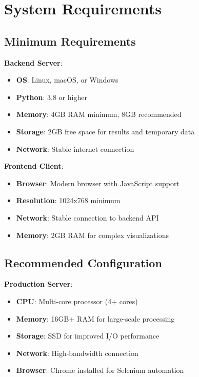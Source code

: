\section{System Requirements}
\label{sec:system-requirements}

\subsection{Minimum Requirements}
\label{subsec:minimum-requirements}

\textbf{Backend Server}:
\begin{itemize}
    \item \textbf{OS}: Linux, macOS, or Windows
    \item \textbf{Python}: 3.8 or higher
    \item \textbf{Memory}: 4GB RAM minimum, 8GB recommended
    \item \textbf{Storage}: 2GB free space for results and temporary data
    \item \textbf{Network}: Stable internet connection
\end{itemize}

\textbf{Frontend Client}:
\begin{itemize}
    \item \textbf{Browser}: Modern browser with JavaScript support
    \item \textbf{Resolution}: 1024x768 minimum
    \item \textbf{Network}: Stable connection to backend API
    \item \textbf{Memory}: 2GB RAM for complex visualizations
\end{itemize}

\subsection{Recommended Configuration}
\label{subsec:recommended-configuration}

\textbf{Production Server}:
\begin{itemize}
    \item \textbf{CPU}: Multi-core processor (4+ cores)
    \item \textbf{Memory}: 16GB+ RAM for large-scale processing
    \item \textbf{Storage}: SSD for improved I/O performance
    \item \textbf{Network}: High-bandwidth connection
    \item \textbf{Browser}: Chrome installed for Selenium automation
\end{itemize}


